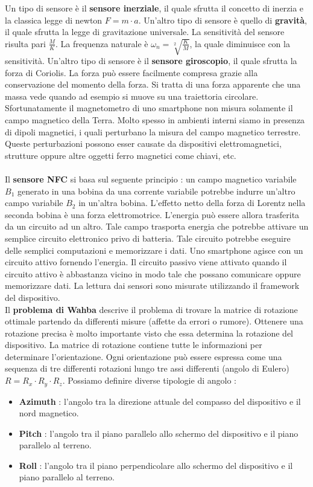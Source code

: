 \documentclass[12pt]{report}
\begin{document}
Un tipo di sensore è il \textbf{sensore inerziale}, il quale sfrutta il concetto di inerzia e la classica legge di newton $F = m\cdot a$. Un'altro tipo di sensore è quello di \textbf{gravità}, il quale sfrutta la legge di gravitazione universale. La sensitività del sensore risulta pari $\frac{M}{K}$. La frequenza naturale è $\omega_n = \sqrt[2]{\frac{K}{M}}$, la quale diminuisce con la sensitività. Un'altro tipo di sensore è il \textbf{sensore giroscopio}, il quale sfrutta la forza di Coriolis. La forza può essere facilmente compresa grazie alla conservazione del momento della forza. Si tratta di una forza apparente che una massa vede quando ad esempio si muove su una traiettoria circolare. Sfortunatamente il magnetometro di uno smartphone non misura solamente il campo magnetico della Terra. Molto spesso in ambienti interni siamo in presenza di dipoli magnetici, i quali perturbano la misura del campo magnetico terrestre. Queste perturbazioni possono esser causate da dispositivi elettromagnetici, strutture oppure altre oggetti ferro magnetici come chiavi, etc. \\\\Il \textbf{sensore NFC} si basa sul seguente principio : un campo magnetico variabile $B_1$ generato in una bobina da una corrente variabile potrebbe indurre un'altro campo variabile $B_2$ in un'altra bobina. L'effetto netto della forza di Lorentz nella seconda bobina è una forza elettromotrice. L'energia può essere allora trasferita da un circuito ad un altro. Tale campo trasporta energia che potrebbe attivare un semplice circuito elettronico privo di batteria. Tale circuito potrebbe eseguire delle semplici computazioni e memorizzare i dati. Uno smartphone agisce con un circuito attivo fornendo l'energia. Il circuito passivo viene attivato quando il circuito attivo è abbastanza vicino in modo tale che possano comunicare oppure memorizzare dati. La lettura dai sensori sono misurate utilizzando il framework del dispositivo. \\Il \textbf{problema di Wahba} descrive il problema di trovare la matrice di rotazione ottimale partendo da differenti misure (affette da errori o rumore). Ottenere una rotazione precisa è molto importante visto che essa determina la rotazione del dispositivo. La matrice di rotazione contiene tutte le informazioni per determinare l'orientazione. Ogni orientazione può essere espressa come una sequenza di tre differenti rotazioni lungo tre assi differenti (angolo di Eulero) $R = R_x \cdot R_y \cdot R_z$. Possiamo definire diverse tipologie di angolo :
\begin{itemize}
\item \textbf{Azimuth} : l'angolo tra la direzione attuale del compasso del dispositivo e il nord magnetico.
\item \textbf{Pitch} : l'angolo tra il piano parallelo allo schermo del dispositivo e il piano parallelo al terreno.
\item \textbf{Roll} : l'angolo tra il piano perpendicolare allo schermo del dispositivo e il piano parallelo al terreno.
\end{itemize}
\end{document}
